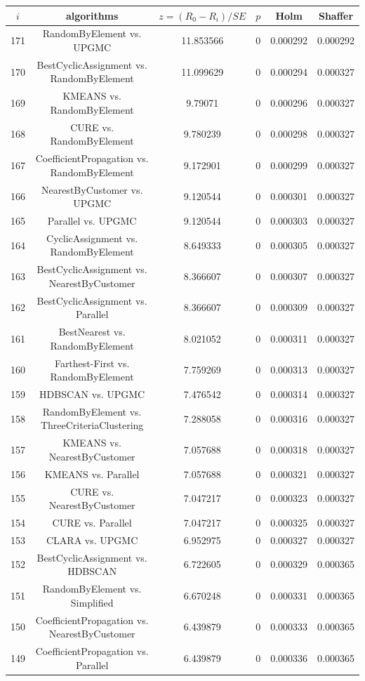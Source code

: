 \documentclass[a4paper,10pt]{article}
\begin{document}
\begin{landscape}
\begin{table}[!htp]
\centering\scriptsize
\begin{tabular}{cccccc}
$i$&algorithms&$z=(R_0 - R_i)/SE$&$p$&Holm&Shaffer\\
\hline171&RandomByElement vs. UPGMC&11.853566&0&0.000292&0.000292\\
170&BestCyclicAssignment vs. RandomByElement&11.099629&0&0.000294&0.000327\\
169&KMEANS vs. RandomByElement&9.79071&0&0.000296&0.000327\\
168&CURE vs. RandomByElement&9.780239&0&0.000298&0.000327\\
167&CoefficientPropagation vs. RandomByElement&9.172901&0&0.000299&0.000327\\
166&NearestByCustomer vs. UPGMC&9.120544&0&0.000301&0.000327\\
165&Parallel vs. UPGMC&9.120544&0&0.000303&0.000327\\
164&CyclicAssignment vs. RandomByElement&8.649333&0&0.000305&0.000327\\
163&BestCyclicAssignment vs. NearestByCustomer&8.366607&0&0.000307&0.000327\\
162&BestCyclicAssignment vs. Parallel&8.366607&0&0.000309&0.000327\\
161&BestNearest vs. RandomByElement&8.021052&0&0.000311&0.000327\\
160&Farthest-First vs. RandomByElement&7.759269&0&0.000313&0.000327\\
159&HDBSCAN vs. UPGMC&7.476542&0&0.000314&0.000327\\
158&RandomByElement vs. ThreeCriteriaClustering&7.288058&0&0.000316&0.000327\\
157&KMEANS vs. NearestByCustomer&7.057688&0&0.000318&0.000327\\
156&KMEANS vs. Parallel&7.057688&0&0.000321&0.000327\\
155&CURE vs. NearestByCustomer&7.047217&0&0.000323&0.000327\\
154&CURE vs. Parallel&7.047217&0&0.000325&0.000327\\
153&CLARA vs. UPGMC&6.952975&0&0.000327&0.000327\\
152&BestCyclicAssignment vs. HDBSCAN&6.722605&0&0.000329&0.000365\\
151&RandomByElement vs. Simplified&6.670248&0&0.000331&0.000365\\
150&CoefficientPropagation vs. NearestByCustomer&6.439879&0&0.000333&0.000365\\
149&CoefficientPropagation vs. Parallel&6.439879&0&0.000336&0.000365\\

\end{tabular}
\end{table}
\end{landscape}
\end{document}
